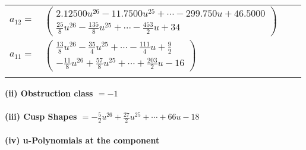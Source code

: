 \documentclass[1p]{elsarticle_modified}
\theoremstyle{definition}
\begin{document}
\begin{tabular}{m{7pt} m{180pt} m{7pt} m{180pt} }
\flushright $a_{12}=$&$\begin{pmatrix}2.12500 u^{26}-11.7500 u^{25}+\cdots-299.750 u+46.5000\\\frac{25}{8} u^{26}-\frac{135}{8} u^{25}+\cdots-\frac{453}{2} u+34\end{pmatrix}$ \\
\flushright $a_{11}=$&$\begin{pmatrix}\frac{13}{8} u^{26}-\frac{35}{4} u^{25}+\cdots-\frac{111}{4} u+\frac{9}{2}\\-\frac{11}{8} u^{26}+\frac{57}{8} u^{25}+\cdots+\frac{203}{2} u-16\end{pmatrix}$\\&\end{tabular}
\flushleft \textbf{(ii) Obstruction class $= -1$}\\~\\
\flushleft \textbf{(iii) Cusp Shapes $= -\frac{5}{2} u^{26}+\frac{27}{2} u^{25}+\cdots+66 u-18$}\\~\\
\newpage\renewcommand{\arraystretch}{1}
\flushleft \textbf{(iv) u-Polynomials at the component}\newline \\
\end{document}
